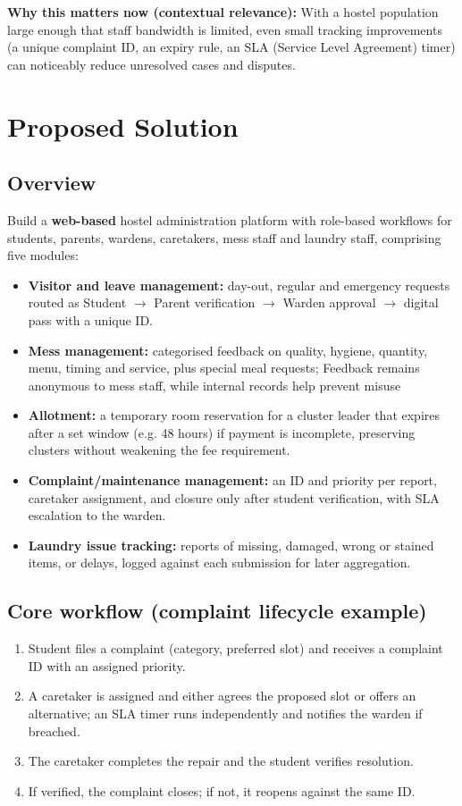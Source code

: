 \documentclass[11pt,a4paper]{article}
\begin{document}
\textbf{Why this matters now (contextual relevance):} With a hostel population large enough
that staff bandwidth is limited, even small tracking improvements (a unique complaint ID, an
expiry rule, an SLA (Service Level Agreement) timer) can noticeably reduce unresolved cases and disputes.

\section{Proposed Solution }
\subsection{Overview}
Build a \textbf{web-based} hostel administration platform with role-based workflows for
students, parents, wardens, caretakers, mess staff and laundry staff, comprising five modules:
\begin{itemize}[leftmargin=0.7cm]
    \item \textbf{Visitor and leave management:} day-out, regular and emergency requests
    routed as Student $\rightarrow$ Parent verification $\rightarrow$ Warden approval
    $\rightarrow$ digital pass with a unique ID.
    \item \textbf{Mess management:} categorised feedback on quality, hygiene, quantity, menu,
    timing and service, plus special meal requests; Feedback remains anonymous to mess staff, while internal records help prevent misuse
    \item \textbf{Allotment:} a temporary room reservation for a cluster leader that expires
    after a set window (e.g. 48 hours) if payment is incomplete, preserving clusters without
    weakening the fee requirement.
    \item \textbf{Complaint/maintenance management:} an ID and priority per report, caretaker
    assignment, and closure only after student verification, with SLA escalation to the
    warden.
    \item \textbf{Laundry issue tracking:} reports of missing, damaged, wrong or stained items,
    or delays, logged against each submission for later aggregation.
\end{itemize}

\subsection{Core workflow (complaint lifecycle example)}
\begin{enumerate}[leftmargin=0.7cm]
    \item Student files a complaint (category, preferred slot) and receives a complaint ID
    with an assigned priority.
    \item A caretaker is assigned and either agrees the proposed slot or offers an alternative;
    an SLA timer runs independently and notifies the warden if breached.
    \item The caretaker completes the repair and the student verifies resolution.
    \item If verified, the complaint closes; if not, it reopens against the same ID.
\end{enumerate}
\end{document}
